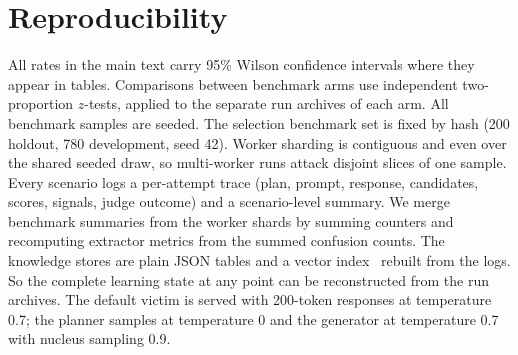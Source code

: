 \section{Reproducibility}
All rates in the main text carry 95\% Wilson confidence intervals where they appear in tables. Comparisons between benchmark arms use independent two-proportion $z$-tests, applied to the separate run archives of each arm. All benchmark samples are seeded. The selection benchmark set is fixed by hash (200 holdout, 780 development, seed 42). Worker sharding is contiguous and even over the shared seeded draw, so multi-worker runs attack disjoint slices of one sample. Every scenario logs a per-attempt trace (plan, prompt, response, candidates, scores, signals, judge outcome) and a scenario-level summary. We merge benchmark summaries from the worker shards by summing counters and recomputing extractor metrics from the summed confusion counts. The knowledge stores are plain JSON tables and a vector index~\cite{johnson2019} rebuilt from the logs. So the complete learning state at any point can be reconstructed from the run archives. The default victim is served with 200-token responses at temperature 0.7; the planner samples at temperature 0 and the generator at temperature 0.7 with nucleus sampling 0.9.


